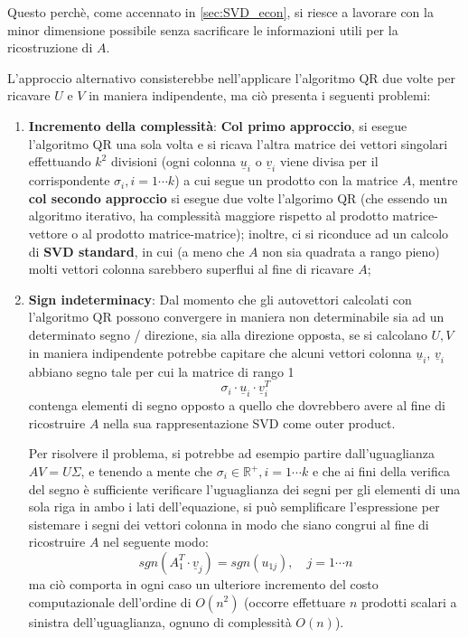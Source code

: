 Questo perchè, come accennato in \ref{sec:SVD_econ}, si riesce a lavorare con la 
minor dimensione possibile senza sacrificare le informazioni utili per la 
ricostruzione di $A$.

L'approccio alternativo consisterebbe nell'applicare l'algoritmo QR due volte 
per ricavare $U$ e $V$ in maniera indipendente, ma ciò presenta i seguenti 
problemi:
\begin{enumerate}
	\item \textbf{Incremento della complessità}: \textbf{Col primo approccio}, si 
esegue l'algoritmo QR una sola volta e si ricava l'altra matrice dei vettori 
singolari effettuando $k^2$ divisioni (ogni colonna $\underline{u}_i$ o 
$\underline{v}_i$ viene divisa per il corrispondente $\sigma_i, i = 1 \cdots k$) 
a cui segue un prodotto con la matrice $A$, mentre \textbf{col secondo 
approccio} si esegue due volte l'algorimo QR (che essendo un algoritmo 
iterativo, ha complessità maggiore rispetto al prodotto matrice-vettore o al 
prodotto matrice-matrice); inoltre, ci si riconduce ad un calcolo di \textbf{SVD 
standard}, in cui (a meno che $A$ non sia quadrata a rango pieno) molti vettori 
colonna sarebbero superflui al fine di ricavare $A$;
	
	\item \textbf{Sign indeterminacy}: Dal momento che gli autovettori calcolati 
con l'algoritmo QR possono convergere in maniera non determinabile sia ad un 
determinato segno / direzione, sia alla direzione opposta, se si calcolano $U,V$ 
in maniera indipendente potrebbe capitare che alcuni vettori colonna 
$\underline{u}_i$, $\underline{v}_i$ abbiano segno tale per cui la matrice di 
rango 1
\begin{equation*}
\sigma_i \cdot \underline{u}_i \cdot \underline{v}_{i}^T
\end{equation*}
contenga elementi di segno opposto a quello che dovrebbero avere al fine di 
ricostruire $A$ nella sua rappresentazione SVD come outer product.

Per risolvere il problema, si potrebbe ad esempio partire dall'uguaglianza $A V 
= U \Sigma$, e tenendo a mente che $\sigma_i \in \mathbb{R}^+, i = 1 \cdots k$ e 
che ai fini della verifica del segno è sufficiente verificare l'uguaglianza dei 
segni per gli elementi di una sola riga in ambo i lati dell'equazione, si può 
semplificare l'espressione per sistemare i segni dei vettori colonna in modo che 
siano congrui al fine di ricostruire $A$ nel seguente modo:
\begin{equation*}
	sgn(A_{1}^T \cdot \underline{v}_j) = sgn(u_{1j}), \quad j = 1 \cdots n
\end{equation*}
 ma ciò comporta in ogni caso un ulteriore incremento del costo computazionale 
dell'ordine di $O(n^2)$ (occorre effettuare $n$ prodotti scalari a sinistra 
dell'uguaglianza, ognuno di complessità $O(n)$).
\end{enumerate}

